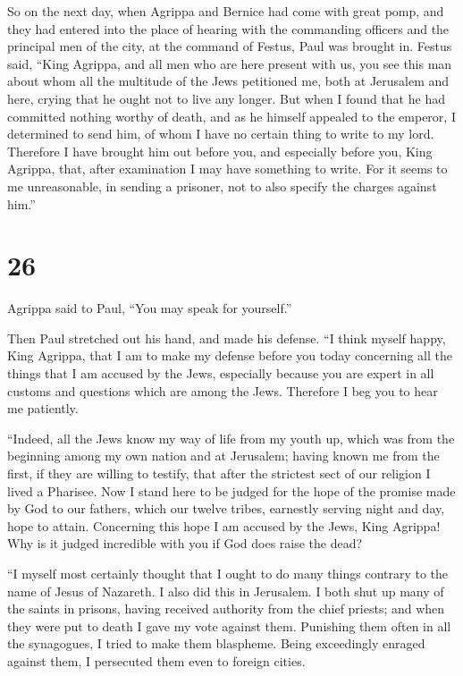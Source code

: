  So on the next day, when Agrippa and Bernice had come with
great pomp, and they had entered into the place of hearing with the
commanding officers and the principal men of the city, at the command of
Festus, Paul was brought in.  Festus said, ``King Agrippa,
and all men who are here present with us, you see this man about whom
all the multitude of the Jews petitioned me, both at Jerusalem and here,
crying that he ought not to live any longer.  But when I
found that he had committed nothing worthy of death, and as he himself
appealed to the emperor, I determined to send him,  of whom
I have no certain thing to write to my lord. Therefore I have brought
him out before you, and especially before you, King Agrippa, that, after
examination I may have something to write.  For it seems to
me unreasonable, in sending a prisoner, not to also specify the charges
against him.''

\hypertarget{section-25}{%
\section{26}\label{section-25}}

 Agrippa said to Paul, ``You may speak for yourself.''

Then Paul stretched out his hand, and made his defense.  ``I
think myself happy, King Agrippa, that I am to make my defense before
you today concerning all the things that I am accused by the Jews,
 especially because you are expert in all customs and
questions which are among the Jews. Therefore I beg you to hear me
patiently.

 ``Indeed, all the Jews know my way of life from my youth
up, which was from the beginning among my own nation and at Jerusalem;
 having known me from the first, if they are willing to
testify, that after the strictest sect of our religion I lived a
Pharisee.  Now I stand here to be judged for the hope of the
promise made by God to our fathers,  which our twelve
tribes, earnestly serving night and day, hope to attain. Concerning this
hope I am accused by the Jews, King Agrippa!  Why is it
judged incredible with you if God does raise the dead?

 ``I myself most certainly thought that I ought to do many
things contrary to the name of Jesus of Nazareth.  I also
did this in Jerusalem. I both shut up many of the saints in prisons,
having received authority from the chief priests; and when they were put
to death I gave my vote against them.  Punishing them often
in all the synagogues, I tried to make them blaspheme. Being exceedingly
enraged against them, I persecuted them even to foreign cities.


